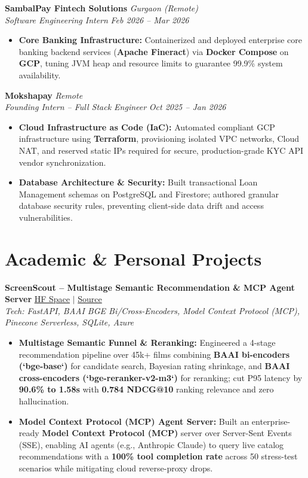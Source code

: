 \documentclass[10pt, a4paper]{article}
\begin{document}
\vspace{0.09ex}
\noindent
\textbf{SambalPay Fintech Solutions} \hfill \textit{Gurgaon (Remote)} \\
\textit{Software Engineering Intern} \hfill \textit{Feb 2026 -- Mar 2026}
\begin{itemize}
    \item \textbf{Core Banking Infrastructure:} Containerized and deployed enterprise core banking backend services (\textbf{Apache Fineract}) via \textbf{Docker Compose} on \textbf{GCP}, tuning JVM heap and resource limits to guarantee 99.9\% system availability.
\end{itemize}

\vspace{0.09ex}
\noindent
\textbf{Mokshapay} \hfill \textit{Remote} \\
\textit{Founding Intern -- Full Stack Engineer} \hfill \textit{Oct 2025 -- Jan 2026}
\begin{itemize}
    \item \textbf{Cloud Infrastructure as Code (IaC):} Automated compliant GCP infrastructure using \textbf{Terraform}, provisioning isolated VPC networks, Cloud NAT, and reserved static IPs required for secure, production-grade KYC API vendor synchronization.
    \item \textbf{Database Architecture \& Security:} Built transactional Loan Management schemas on PostgreSQL and Firestore; authored granular database security rules, preventing client-side data drift and access vulnerabilities.
\end{itemize}

\section*{Academic \& Personal Projects}
\noindent
\textbf{ScreenScout -- Multistage Semantic Recommendation \& MCP Agent Server} \hfill \href{https://huggingface.co/spaces/Agrannya/CinemaAI}{\faLink{} HF Space} $|$ \href{https://github.com/Agrannya-Singh/Semantic-Recommendation-Service}{\faGithub{} Source} \\
\textit{Tech: FastAPI, BAAI BGE Bi/Cross-Encoders, Model Context Protocol (MCP), Pinecone Serverless, SQLite, Azure}
\begin{itemize}
    \item \textbf{Multistage Semantic Funnel \& Reranking:} Engineered a 4-stage recommendation pipeline over 45k+ films combining \textbf{BAAI bi-encoders (`bge-base`)} for candidate search, Bayesian rating shrinkage, and \textbf{BAAI cross-encoders (`bge-reranker-v2-m3`)} for reranking; cut P95 latency by \textbf{90.6\% to 1.58s} with \textbf{0.784 NDCG@10} ranking relevance and zero hallucination.
    \item \textbf{Model Context Protocol (MCP) Agent Server:} Built an enterprise-ready \textbf{Model Context Protocol (MCP)} server over Server-Sent Events (SSE), enabling AI agents (e.g., Anthropic Claude) to query live catalog recommendations with a \textbf{100\% tool completion rate} across 50 stress-test scenarios while mitigating cloud reverse-proxy drops.
\end{itemize}
\end{document}
